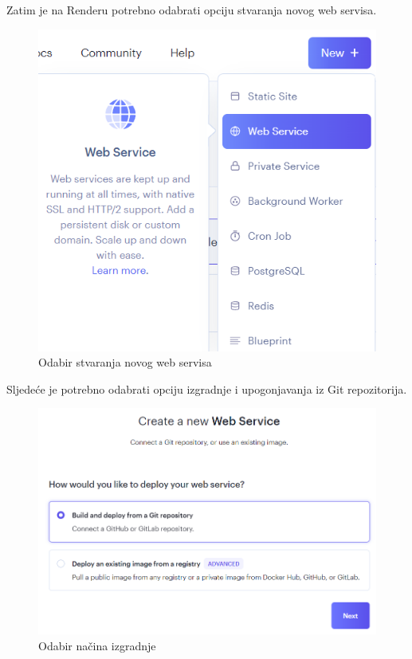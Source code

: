 			Zatim je na Renderu potrebno odabrati opciju stvaranja novog web servisa.
			
			\begin{figure}[H]
				\includegraphics[scale=0.8]{slike/upute/odabirStvaranjaWebServisa.png} %
				\centering
				\caption{Odabir stvaranja novog web servisa}
				\label{fig:odabirStvaranjaWebServisa} %
			\end{figure}
			
			Sljedeće je potrebno odabrati opciju izgradnje i upogonjavanja iz Git repozitorija.
			
			\begin{figure}[H]
				\includegraphics[width=\textwidth]{slike/upute/odabirIzvoraIzgradnje.png} %
				\caption{Odabir načina izgradnje}
				\label{fig:odabirIzvoraIzgradnje} %
			\end{figure}
			
